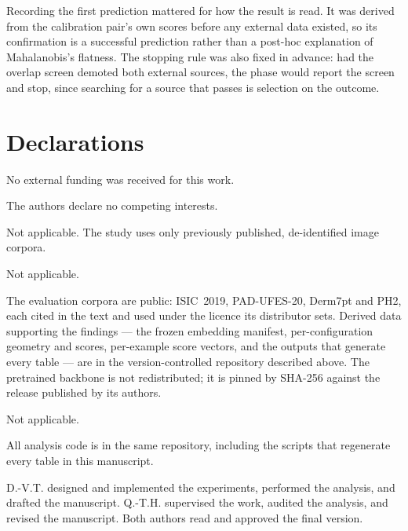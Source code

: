 \documentclass[pdflatex,sn-basic]{sn-jnl}
\theoremstyle{plain}
\theoremstyle{definition}
\theoremstyle{remark}
\begin{document}
Recording the first prediction mattered for how the result is read. It was
derived from the calibration pair's own scores before any external data
existed, so its confirmation is a successful prediction rather than a
post-hoc explanation of Mahalanobis's flatness. The stopping rule was also
fixed in advance: had the overlap screen demoted both external sources, the
phase would report the screen and stop, since searching for a source that
passes is selection on the outcome.

\backmatter

\section*{Declarations}

 No external funding was received for this work.

 The authors declare no competing interests.

 Not applicable. The study
uses only previously published, de-identified image corpora.

 Not applicable.

 The evaluation corpora are public: ISIC~2019,
PAD-UFES-20, Derm7pt and PH2, each cited in the text and used under the licence
its distributor sets. Derived data supporting the findings --- the frozen
embedding manifest, per-configuration geometry and scores, per-example score
vectors, and the outputs that generate every table --- are in the
version-controlled repository described above. The pretrained backbone is not
redistributed; it is pinned by SHA-256 against the release published by its
authors.

 Not applicable.

 All analysis code is in the same repository,
including the scripts that regenerate every table in this manuscript.

 D.-V.T. designed and implemented the experiments,
performed the analysis, and drafted the manuscript. Q.-T.H. supervised the
work, audited the analysis, and revised the manuscript. Both authors read and
approved the final version.


\end{document}
